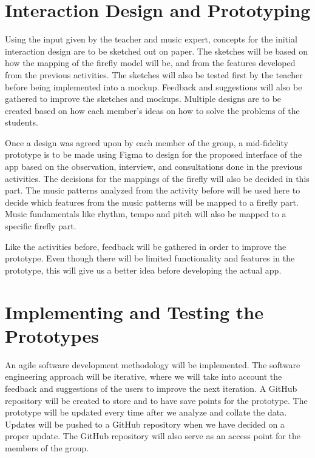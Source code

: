 \section{Interaction Design and Prototyping}
Using the input given by the teacher and music expert, concepts for the initial interaction design are to be sketched out on paper. The sketches will be based on how the mapping of the firefly model will be, and from the features developed from the previous activities. The sketches will also be tested first by the teacher before being implemented into a mockup. Feedback and suggestions will also be gathered to improve the sketches and mockups. Multiple designs are to be created based on how each member's ideas on how to solve the problems of the students. 

Once a design was agreed upon by each member of the group, a mid-fidelity prototype is to be made using Figma to design for the proposed interface of the app based on the observation, interview, and consultations done in the previous activities. The decisions for the mappings of the firefly will also be decided in this part. The music patterns analyzed from the activity before will be used here to decide which features from the music patterns will be mapped to a firefly part. Music fundamentals like rhythm, tempo and pitch will also be mapped to a specific firefly part.

Like the activities before, feedback will be gathered in order to improve the prototype. Even though there will be limited functionality and features in the prototype, this will give us a better idea before developing the actual app.

\section{Implementing and Testing the Prototypes}
An agile software development methodology will be implemented. The software engineering approach will be iterative, where we will take into account the feedback and suggestions of the users to improve the next iteration. A GitHub repository will be created to store and to have save points for the prototype. The prototype will be updated every time after we analyze and collate the data. Updates will be pushed to a GitHub repository when we have decided on a proper update. The GitHub repository will also serve as an access point for the members of the group. 

